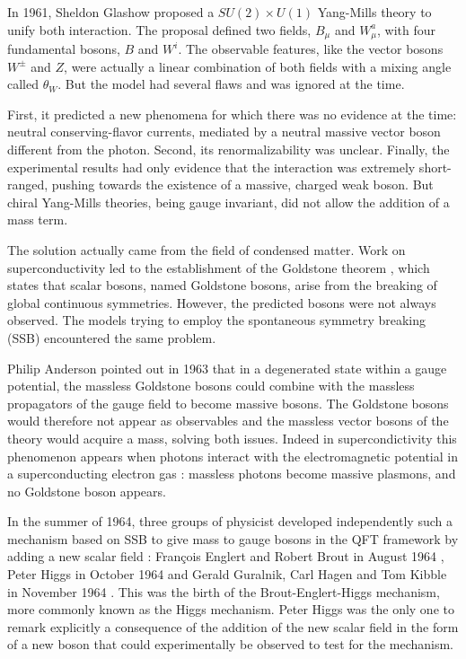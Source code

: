 In 1961, Sheldon Glashow proposed a $SU(2) \times U(1)$ Yang-Mills theory \cite{GLASHOW1961579} to unify both interaction.  The proposal defined two fields, $B_{\mu}$ and $W_{\mu}^a$, with four fundamental bosons, $B$ and $W^i$. The observable features, like the vector bosons $W^{\pm}$ and $Z$, were actually a linear combination of both fields with a mixing angle called $\theta_W$. But the model had several flaws and was ignored at the time.

First, it predicted a new phenomena for which there was no evidence at the time: neutral conserving-flavor currents, mediated by a neutral massive vector boson different from the photon. Second, its renormalizability was unclear. Finally, the experimental results had only evidence that the interaction was extremely short-ranged, pushing towards the existence of a massive, charged weak boson. But chiral Yang-Mills theories, being gauge invariant, did not allow the addition of a mass term.

The solution actually came from the field of condensed matter. Work on superconductivity led to the establishment of the Goldstone theorem \cite{PhysRev.127.965}, which states that scalar bosons, named Goldstone bosons, arise from the breaking of global continuous symmetries. However, the predicted bosons were not always observed. The models trying to employ the spontaneous symmetry breaking (SSB) encountered the same problem.

Philip Anderson pointed out in 1963 \cite{PhysRev.130.439} that in a degenerated state within a gauge potential, the massless Goldstone bosons could combine with the massless propagators of the gauge field to become massive bosons. The Goldstone bosons would therefore not appear as observables and the massless vector bosons of the theory would acquire a mass, solving both issues. Indeed in supercondictivity this phenomenon appears when photons interact with the electromagnetic potential in a superconducting electron gas : massless photons become massive plasmons, and no Goldstone boson appears.

In the summer of 1964, three groups of physicist developed independently such a mechanism based on SSB to give mass to gauge bosons in the QFT framework by adding a new scalar field : François Englert and Robert Brout in August 1964 \cite{PhysRevLett.13.321}, Peter Higgs in October 1964 \cite{HIGGS1964132,PhysRevLett.13.508} and Gerald Guralnik, Carl Hagen and Tom Kibble in November 1964 \cite{PhysRevLett.13.585}. This was the birth of the Brout-Englert-Higgs mechanism, more commonly known as the Higgs mechanism. Peter Higgs was the only one to remark explicitly a consequence of the addition of the new scalar field in the form of a new boson that could experimentally be observed to test for the mechanism. 

